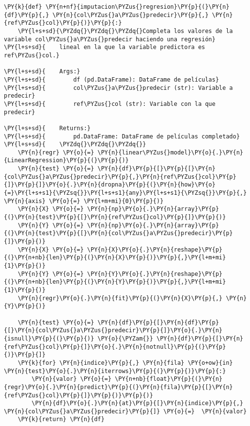     \begin{tcolorbox}[breakable, size=fbox, boxrule=1pt, pad at break*=1mm,colback=cellbackground, colframe=cellborder]
\begin{Verbatim}[commandchars=\\\{\}]
\PY{k}{def} \PY{n+nf}{imputacion\PYZus{}regresion}\PY{p}{(}\PY{n}{df}\PY{p}{,} \PY{n}{col\PYZus{}a\PYZus{}predecir}\PY{p}{,} \PY{n}{ref\PYZus{}col}\PY{p}{)}\PY{p}{:}
    \PY{l+s+sd}{\PYZdq{}\PYZdq{}\PYZdq{}Completa los valores de la variable col\PYZus{}a\PYZus{}predecir haciendo una regresión}
\PY{l+s+sd}{    lineal en la que la variable predictora es ref\PYZus{}col.}

\PY{l+s+sd}{    Args:}
\PY{l+s+sd}{        df (pd.DataFrame): DataFrame de películas}
\PY{l+s+sd}{        col\PYZus{}a\PYZus{}predecir (str): Variable a predecir}
\PY{l+s+sd}{        ref\PYZus{}col (str): Variable con la que predecir}

\PY{l+s+sd}{    Returns:}
\PY{l+s+sd}{        pd.DataFrame: DataFrame de películas completado}
\PY{l+s+sd}{    \PYZdq{}\PYZdq{}\PYZdq{}}
    \PY{n}{regr} \PY{o}{=} \PY{n}{linear\PYZus{}model}\PY{o}{.}\PY{n}{LinearRegression}\PY{p}{(}\PY{p}{)}
    \PY{n}{test} \PY{o}{=} \PY{n}{df}\PY{p}{[}\PY{p}{[}\PY{n}{col\PYZus{}a\PYZus{}predecir}\PY{p}{,}\PY{n}{ref\PYZus{}col}\PY{p}{]}\PY{p}{]}\PY{o}{.}\PY{n}{dropna}\PY{p}{(}\PY{n}{how}\PY{o}{=}\PY{l+s+s1}{\PYZsq{}}\PY{l+s+s1}{any}\PY{l+s+s1}{\PYZsq{}}\PY{p}{,} \PY{n}{axis} \PY{o}{=} \PY{l+m+mi}{0}\PY{p}{)}
    \PY{n}{X} \PY{o}{=} \PY{n}{np}\PY{o}{.}\PY{n}{array}\PY{p}{(}\PY{n}{test}\PY{p}{[}\PY{n}{ref\PYZus{}col}\PY{p}{]}\PY{p}{)}
    \PY{n}{Y} \PY{o}{=} \PY{n}{np}\PY{o}{.}\PY{n}{array}\PY{p}{(}\PY{n}{test}\PY{p}{[}\PY{n}{col\PYZus{}a\PYZus{}predecir}\PY{p}{]}\PY{p}{)}
    \PY{n}{X} \PY{o}{=} \PY{n}{X}\PY{o}{.}\PY{n}{reshape}\PY{p}{(}\PY{n+nb}{len}\PY{p}{(}\PY{n}{X}\PY{p}{)}\PY{p}{,}\PY{l+m+mi}{1}\PY{p}{)}
    \PY{n}{Y} \PY{o}{=} \PY{n}{Y}\PY{o}{.}\PY{n}{reshape}\PY{p}{(}\PY{n+nb}{len}\PY{p}{(}\PY{n}{Y}\PY{p}{)}\PY{p}{,}\PY{l+m+mi}{1}\PY{p}{)}
    \PY{n}{regr}\PY{o}{.}\PY{n}{fit}\PY{p}{(}\PY{n}{X}\PY{p}{,} \PY{n}{Y}\PY{p}{)}

    \PY{n}{test} \PY{o}{=} \PY{n}{df}\PY{p}{[}\PY{n}{df}\PY{p}{[}\PY{n}{col\PYZus{}a\PYZus{}predecir}\PY{p}{]}\PY{o}{.}\PY{n}{isnull}\PY{p}{(}\PY{p}{)} \PY{o}{\PYZam{}} \PY{n}{df}\PY{p}{[}\PY{n}{ref\PYZus{}col}\PY{p}{]}\PY{o}{.}\PY{n}{notnull}\PY{p}{(}\PY{p}{)}\PY{p}{]}
    \PY{k}{for} \PY{n}{indice}\PY{p}{,} \PY{n}{fila} \PY{o+ow}{in} \PY{n}{test}\PY{o}{.}\PY{n}{iterrows}\PY{p}{(}\PY{p}{)}\PY{p}{:}
        \PY{n}{valor} \PY{o}{=} \PY{n+nb}{float}\PY{p}{(}\PY{n}{regr}\PY{o}{.}\PY{n}{predict}\PY{p}{(}\PY{n}{fila}\PY{p}{[}\PY{n}{ref\PYZus{}col}\PY{p}{]}\PY{p}{)}\PY{p}{)}
        \PY{n}{df}\PY{o}{.}\PY{n}{at}\PY{p}{[}\PY{n}{indice}\PY{p}{,} \PY{n}{col\PYZus{}a\PYZus{}predecir}\PY{p}{]} \PY{o}{=}  \PY{n}{valor}
    \PY{k}{return} \PY{n}{df}
\end{Verbatim}
\end{tcolorbox}

